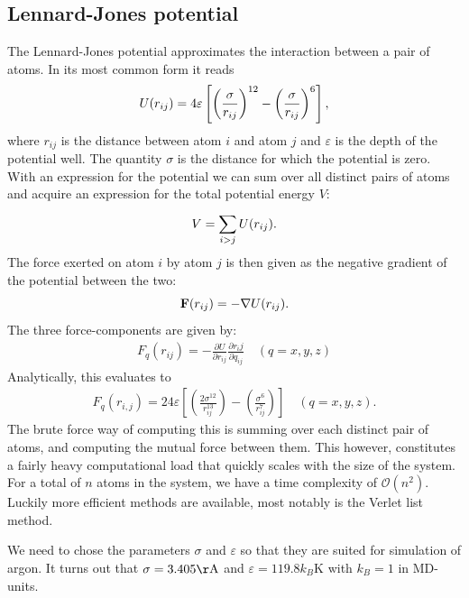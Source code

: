 \documentclass[a4paper]{article}
\renewcommand{\vec}[1]{\mathbf{#1}}
\begin{document}
\subsection{Lennard-Jones potential}
\label{sub:lennard_jones_potential}

    The Lennard-Jones potential approximates the interaction between a pair of
    atoms. In its most common form it reads
    \begin{equation}
        \notag U(r_{ij}) = 4\varepsilon \left[ \left( \frac{\sigma}{r_{ij}}
        \right)^{12} - \left( \frac{\sigma}{r_{ij}} \right)^6 \right],
    \end{equation}
    where $r_{ij}$ is the distance between atom $i$ and atom $j$ and
    $\varepsilon$ is the depth of the potential well. The quantity $\sigma$ is
    the distance for which the potential is zero.  With an expression for the
    potential we can sum over all distinct pairs of atoms and acquire an
    expression for the total potential energy $V$:
    \begin{equation}
        \notag V = \sum^{}_{i>j}U(r_{ij}).
    \end{equation}
    The force exerted on atom $i$ by atom $j$ is then given as the negative
    gradient of the potential between the two:
    \begin{equation}
        \notag \vec{F}(r_{ij}) = -\nabla U(r_{ij}).
    \end{equation}
    The three force-components are given by:
    \begin{align*}
        F_q(r_{ij}) = -\frac{\partial U}{\partial r_{ij}} \frac{\partial
        r_ij}{\partial q_{ij}} \quad (q = x, y, z)
    \end{align*}
    Analytically, this evaluates to
    \begin{align*}
        F_q(r_{i, j}) = 24\varepsilon \left[ \left(
        \frac{2\sigma^{12}}{r_{ij}^{13}}\right) - \left(
        \frac{\sigma^6}{r_{ij}^7}\right)\right] \quad (q = x, y, z).
    \end{align*}
    The brute force way of computing this is summing over each distinct pair of
    atoms, and computing the mutual force between them. This however,
    constitutes a fairly heavy computational load that quickly scales with the
    size of the system. For a total of $n$ atoms in the system, we have a time
    complexity of $\mathcal{O}(n^2)$. Luckily more efficient methods are
    available, most notably is the Verlet list method. 
    
    We need to chose the parameters $\sigma$ and $\varepsilon$ so that they are
    suited for simulation of argon. It turns out that $\sigma = 3.405
    \mathrm{\AA}$ and $\varepsilon = 119.8k_B\mathrm{K}$ with $k_B = 1$ in
    MD-units.
\end{document}
